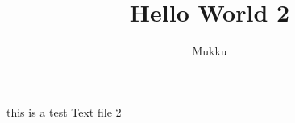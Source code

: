 \documentclass{article}
\title{Hello World 2}
\author{Mukku}
\begin{document}
\maketitle

this is a test Text file 2
\end{document}
